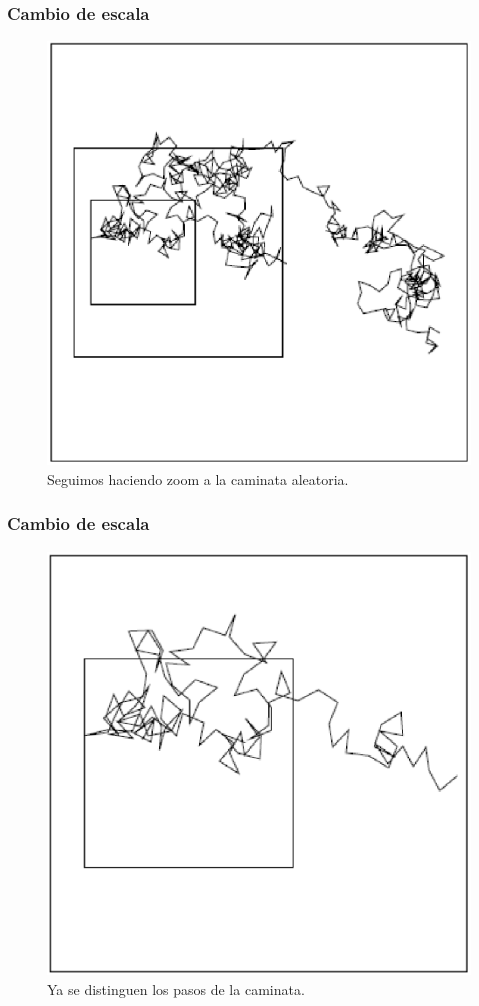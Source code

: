 \begin{frame}
\frametitle{Cambio de escala}
\begin{figure}
	\centering
	\includegraphics[scale=0.5]{Imagenes/caminataAleatoria_04.eps}
	\caption{Seguimos haciendo zoom a la caminata aleatoria.}
\end{figure}
\end{frame}
\begin{frame}
\frametitle{Cambio de escala}
\begin{figure}
	\centering
	\includegraphics[scale=0.5]{Imagenes/caminataAleatoria_05.eps}
	\caption{Ya se distinguen los pasos de la caminata.}
\end{figure}
\end{frame}
